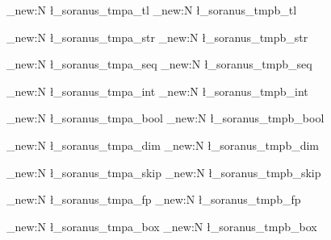 %
%
%
% 
%



%

\tl_new:N \l_soranus_tmpa_tl
\tl_new:N \l_soranus_tmpb_tl

\str_new:N \l_soranus_tmpa_str
\str_new:N \l_soranus_tmpb_str

\seq_new:N \l_soranus_tmpa_seq
\seq_new:N \l_soranus_tmpb_seq

\int_new:N \l_soranus_tmpa_int
\int_new:N \l_soranus_tmpb_int

\bool_new:N \l_soranus_tmpa_bool
\bool_new:N \l_soranus_tmpb_bool

\dim_new:N \l_soranus_tmpa_dim
\dim_new:N \l_soranus_tmpb_dim

\skip_new:N \l_soranus_tmpa_skip
\skip_new:N \l_soranus_tmpb_skip

\fp_new:N \l_soranus_tmpa_fp
\fp_new:N \l_soranus_tmpb_fp

\box_new:N \l_soranus_tmpa_box
\box_new:N \l_soranus_tmpb_box



%
